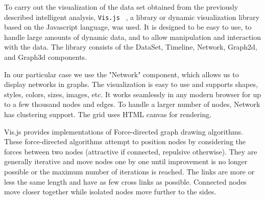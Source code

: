 To carry out the visualization of the data set obtained from the previously described intelligent analysis, \texttt{Vis.js} ~\cite{visjsPaginaWeb}, a library or dynamic visualization library based on the Javascript language, was used.
It is designed to be easy to use, to handle large amounts of dynamic data, and to allow manipulation and interaction with the data. The library consists of the DataSet, Timeline, Network, Graph2d, and Graph3d components.

In our particular case we use the "Network" component, which allows us to display networks in graphs. The visualization is easy to use and supports shapes, styles, colors, sizes, images, etc. It works seamlessly in any modern browser for up to a few thousand nodes and edges. To handle a larger number of nodes, Network has clustering support. The grid uses HTML canvas for rendering.

Vis.js provides implementations of Force-directed graph drawing algorithms. These force-directed algorithms attempt to position nodes by considering the forces between two nodes (attractive if connected, repulsive otherwise). They are generally iterative and move nodes one by one until improvement is no longer possible or the maximum number of iterations is reached. The links are more or less the same length and have as few cross links as possible. Connected nodes move closer together while isolated nodes move further to the sides.




